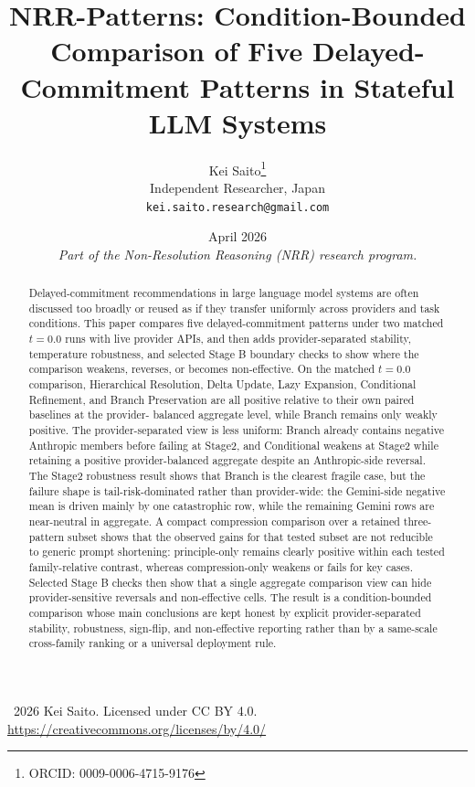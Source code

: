 \documentclass[11pt,a4paper]{article}
\title{\textbf{NRR-Patterns: Condition-Bounded Comparison of Five Delayed-Commitment Patterns in Stateful LLM Systems}}
\author{
  Kei Saito\thanks{ORCID: 0009-0006-4715-9176} \\
  Independent Researcher, Japan \\
  \texttt{kei.saito.research@gmail.com}
}
\date{April 2026 \\[0.5em]
\textit{Part of the Non-Resolution Reasoning (NRR) research program.}}
\begin{document}
\maketitle

\begin{center}
\textcopyright\ 2026 Kei Saito.
Licensed under CC BY 4.0.\\
\url{https://creativecommons.org/licenses/by/4.0/}
\end{center}

\begin{abstract}
Delayed-commitment recommendations in large language model systems are often
discussed too broadly or reused as if they transfer uniformly across providers
and task conditions. This paper compares five delayed-commitment patterns under
two matched \(t=0.0\) runs with live provider APIs, and then adds
provider-separated stability, temperature robustness, and selected Stage B
boundary checks to show where the comparison weakens, reverses, or becomes
non-effective. On the matched \(t=0.0\) comparison, Hierarchical Resolution,
Delta Update, Lazy Expansion, Conditional Refinement, and Branch Preservation
are all positive relative to their own paired baselines at the provider-
balanced aggregate level, while Branch remains only weakly positive. The
provider-separated view is less uniform: Branch already contains negative
Anthropic members before failing at Stage2, and Conditional weakens at Stage2
while retaining a positive provider-balanced aggregate despite an Anthropic-side
reversal. The Stage2 robustness result shows that Branch is the clearest
fragile case, but the failure shape is tail-risk-dominated rather than
provider-wide: the Gemini-side negative mean is driven mainly by one
catastrophic row, while the remaining Gemini rows are near-neutral in
aggregate. A compact compression comparison over a retained three-pattern
subset shows that the observed gains for that tested subset are not reducible
to generic prompt shortening: principle-only remains clearly positive within
each tested family-relative contrast, whereas compression-only weakens or fails
for key cases. Selected Stage B checks then show that a single aggregate
comparison view can hide provider-sensitive reversals and non-effective cells.
The result is a condition-bounded comparison whose main conclusions are kept
honest by explicit provider-separated stability, robustness, sign-flip, and
non-effective reporting rather than by a same-scale cross-family ranking or a
universal deployment rule.

\end{abstract}
\end{document}
